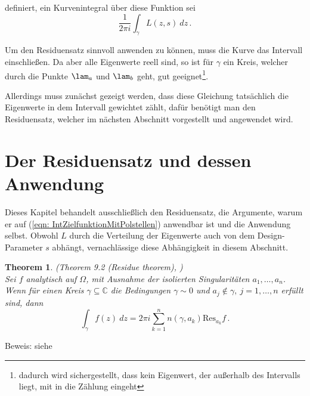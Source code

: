 \documentclass[a4paper,12pt]{report}
\newcommand{\C}{\mathbb C}
\newcommand{\1}{\mathds{1}}
\newcommand{\Res}{\text{Res}}
\theoremstyle{plain} %
\newtheorem{theorem}{Theorem}
\theoremstyle{definition} %
\theoremstyle{remark}
\begin{document}
            definiert, ein Kurvenintegral über diese Funktion sei
            \begin{equation}
                  \label{eqn: IntZielfunktionMitPolstellen}
                  \frac{1}{2\pi i}\int_\gamma L(z, s)\ dz\,.
            \end{equation}

            Um den Residuensatz sinnvoll anwenden zu können, muss die Kurve \gamm das Intervall \lamAlamB einschließen.
            Da aber alle Eigenwerte reell sind, so ist für $\gamma$ ein Kreis, welcher durch die Punkte $\lam_a$ und $\lam_b$ geht, gut geeignet\footnote{dadurch wird sichergestellt,
            dass kein Eigenwert, der außerhalb des Intervalls \lamAlamB liegt, mit in die Zählung eingeht}.

            Allerdings muss zunächst gezeigt werden, dass diese Gleichung tatsächlich die Eigenwerte in dem Intervall gewichtet zählt, dafür benötigt man den Residuensatz,
            welcher im nächsten Abschnitt vorgestellt und angewendet wird.

      \section{Der Residuensatz und dessen Anwendung}
            Dieses Kapitel behandelt ausschließlich den Residuensatz, die Argumente, warum er auf (\ref{eqn: IntZielfunktionMitPolstellen}) anwendbar ist und die Anwendung selbst.
            Obwohl $L$ durch die Verteilung der Eigenwerte auch von dem Design-Parameter $s$ abhängt, vernachlässige diese Abhängigkeit in diesem Abschnitt.

            \begin{theorem}(Theorem 9.2 (Residue theorem), \cite[S. 141]{complexAnalysis})\\
                  \label{thrm: Residuensatz}
                  Sei $f$ analytisch auf $\Omega$, mit Ausnahme der isolierten Singularitäten $a_1,\dots,a_n$. Wenn für einen Kreis $\gamma\subseteq\C$
                  die Bedingungen $\gamma \sim 0$ und $a_j\notin \gamma,\ j=1,\dots,n$ erfüllt sind, dann
                  $$\int_\gamma f(z)\ dz = 2\pi i\sum_{k=1}^{n} n(\gamma, a_k)\Res_{a_k}f\,.$$
            \end{theorem}
            Beweis: siehe \cite[S. 142]{complexAnalysis}
\end{document}
